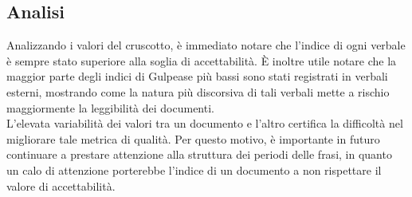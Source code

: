 \subsection{Analisi}
Analizzando i valori del cruscotto, è immediato notare che l'indice di ogni verbale è sempre stato superiore alla soglia di accettabilità. È inoltre utile notare che la maggior parte degli indici di Gulpease più bassi sono stati registrati in verbali esterni, mostrando come la natura più discorsiva di tali verbali mette a rischio maggiormente la leggibilità dei documenti.\\
L'elevata variabilità dei valori tra un documento e l'altro certifica la difficoltà nel migliorare tale metrica di qualità. Per questo motivo, è importante in futuro continuare a prestare attenzione alla struttura dei periodi delle frasi, in quanto un calo di attenzione porterebbe l'indice di un documento a non rispettare il valore di accettabilità.
